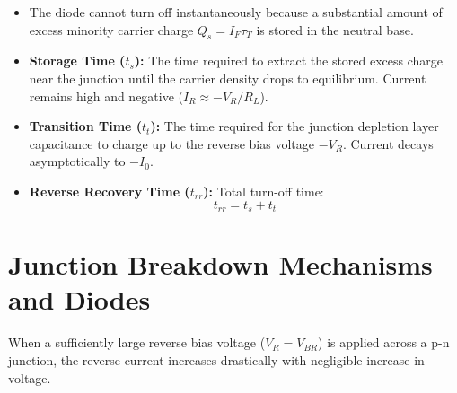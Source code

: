 \documentclass[12pt,a4paper]{article}
\begin{document}
\begin{itemize}[leftmargin=*, itemsep=3pt]
  \item The diode cannot turn off instantaneously because a substantial amount of excess minority carrier charge $Q_s = I_F \tau_T$ is stored in the neutral base.
  \item \textbf{Storage Time ($t_s$):} The time required to extract the stored excess charge near the junction until the carrier density drops to equilibrium. Current remains high and negative ($I_R \approx -V_R / R_L$).
  \item \textbf{Transition Time ($t_t$):} The time required for the junction depletion layer capacitance to charge up to the reverse bias voltage $-V_R$. Current decays asymptotically to $-I_0$.
  \item \textbf{Reverse Recovery Time ($t_{rr}$):} Total turn-off time:
  \begin{equation}
    t_{rr} = t_s + t_t
  \end{equation}
\end{itemize}

\section{Junction Breakdown Mechanisms and Diodes}

When a sufficiently large reverse bias voltage ($V_R = V_{BR}$) is applied across a p-n junction, the reverse current increases drastically with negligible increase in voltage.
\end{document}
